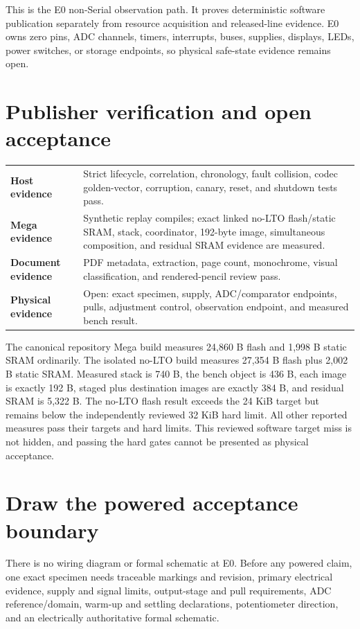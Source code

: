 \documentclass[10pt]{article}
\begin{document}
This is the E0 non-Serial observation path. It proves deterministic software
publication separately from resource acquisition and released-line evidence.
E0 owns zero pins, ADC channels, timers, interrupts, buses, supplies, displays,
LEDs, power switches, or storage endpoints, so physical safe-state evidence
remains open.

\section{Publisher verification and open acceptance}
\begin{tabularx}{\linewidth}{@{}>{\bfseries}l X@{}}
Host evidence & Strict lifecycle, correlation, chronology, fault collision,
codec golden-vector, corruption, canary, reset, and shutdown tests pass.\\
Mega evidence & Synthetic replay compiles; exact linked no-LTO flash/static
SRAM, stack, coordinator, 192-byte image, simultaneous composition, and
residual SRAM evidence are measured.\\
Document evidence & PDF metadata, extraction, page count, monochrome, visual
classification, and rendered-pencil review pass.\\
Physical evidence & Open: exact specimen, supply, ADC/comparator endpoints,
pulls, adjustment control, observation endpoint, and measured bench result.\\
\end{tabularx}

The canonical repository Mega build measures 24,860 B flash and 1,998 B
static SRAM ordinarily. The isolated no-LTO build measures 27,354 B flash
plus 2,002 B static SRAM. Measured stack is 740 B, the bench object is 436 B,
each image is exactly 192 B, staged plus destination images are exactly
384 B, and residual SRAM is 5,322 B. The no-LTO flash result exceeds the
24 KiB target but remains below the independently reviewed 32 KiB hard limit.
All other reported measures pass their targets and hard limits. This reviewed
software target miss is not hidden, and passing the hard gates cannot be
presented as physical acceptance.

\newpage
\section{Draw the powered acceptance boundary}
There is no wiring diagram or formal schematic at E0. Before any powered
claim, one exact specimen needs traceable markings and revision, primary
electrical evidence, supply and signal limits, output-stage and pull
requirements, ADC reference/domain, warm-up and settling declarations,
potentiometer direction, and an electrically authoritative formal schematic.
\end{document}
